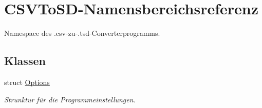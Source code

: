 \hypertarget{namespaceCSVToSD}{\section{C\-S\-V\-To\-S\-D-\/\-Namensbereichsreferenz}
\label{namespaceCSVToSD}
}


Namespace des .csv-\/zu-\/.\-tsd-\/\-Converterprogramms.  


\subsection*{Klassen}
\begin{DoxyCompactItemize}
\item 
struct \hyperlink{structCSVToSD_1_1Options}{Options}
\begin{DoxyCompactList}\small\item\em Strunktur für die Programmeinstellungen. \end{DoxyCompactList}\end{DoxyCompactItemize}
